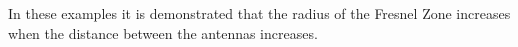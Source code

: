 \noindent In these examples it is demonstrated that the radius of the Fresnel Zone increases when the distance between the antennas increases.
\newpage
